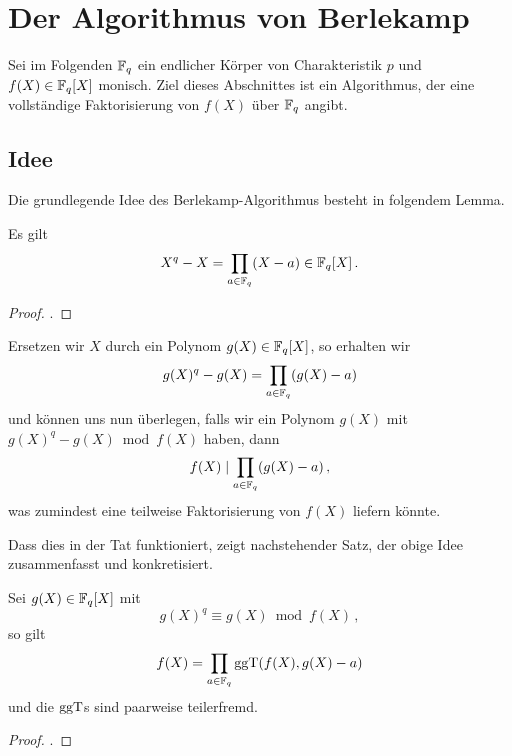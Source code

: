 \section{Der Algorithmus von Berlekamp}
\label{sec:berlekamp}
Sei im Folgenden $\mathbb{F}_q$ ein endlicher Körper von Charakteristik $p$ und
$f(X) \in \mathbb{F}_q[X]$ monisch. Ziel dieses Abschnittes ist ein Algorithmus, der eine
vollständige Faktorisierung von $f(X)$ über $\mathbb{F}_q$ angibt.

\subsection{Idee}
Die grundlegende Idee des Berlekamp-Algorithmus besteht in folgendem Lemma.

\begin{lemma}\label{lemma:berlekamp1}
  Es gilt
  \[ X^q - X = \prod_{a\in \mathbb{F}_q} (X- a) \in \mathbb{F}_q[X] \,.\]
\end{lemma}
\begin{proof}
 \autocite[Theorem 6.1 mit Corollary 4.5]{wan2003lectures}.
\end{proof}

Ersetzen wir $X$ durch ein Polynom $g(X) \in \mathbb{F}_q[X]$, so erhalten wir
\[ g(X)^q - g(X) = \prod_{a\in \mathbb{F}_q} (g(X) - a)\]
und können uns nun überlegen, falls wir ein Polynom $g(X)$ mit
$g(X)^q - g(X) \bmod f(X)$ haben, dann
\[ f(X) \mid \prod_{a\in \mathbb{F}_q} (g(X)-a) \,,\]
was zumindest eine teilweise Faktorisierung von $f(X)$ liefern könnte.

Dass dies in der Tat funktioniert, zeigt nachstehender Satz, der obige
Idee zusammenfasst und konkretisiert.


\begin{thm}
  \label{satz:berlekamp1}
  Sei $g(X) \in \mathbb{F}_q[X]$ mit
  \[ g(X)^q \equiv g(X)  \bmod f(X)\,,\]
  so gilt
  \[ f(X) = \prod_{a\in \mathbb{F}_q} \operatorname{ggT}(f(X),g(X)-a)\]
  und die $\operatorname{ggT}$s sind paarweise teilerfremd.
\end{thm}
\begin{proof}
  \autocite[Theorem 9.1]{wan2003lectures}.
\end{proof}


